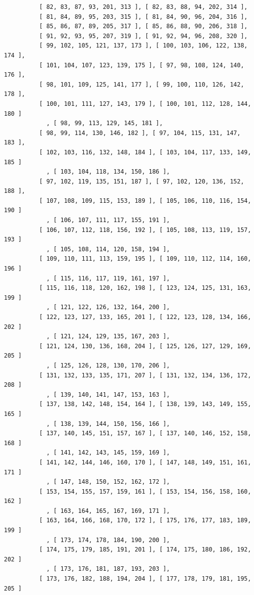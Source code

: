\documentclass{article}
\begin{document}
\begin{verbatim}
          [ 82, 83, 87, 93, 201, 313 ], [ 82, 83, 88, 94, 202, 314 ], 
          [ 81, 84, 89, 95, 203, 315 ], [ 81, 84, 90, 96, 204, 316 ], 
          [ 85, 86, 87, 89, 205, 317 ], [ 85, 86, 88, 90, 206, 318 ], 
          [ 91, 92, 93, 95, 207, 319 ], [ 91, 92, 94, 96, 208, 320 ], 
          [ 99, 102, 105, 121, 137, 173 ], [ 100, 103, 106, 122, 138, 174 ],
          [ 101, 104, 107, 123, 139, 175 ], [ 97, 98, 108, 124, 140, 176 ], 
          [ 98, 101, 109, 125, 141, 177 ], [ 99, 100, 110, 126, 142, 178 ], 
          [ 100, 101, 111, 127, 143, 179 ], [ 100, 101, 112, 128, 144, 180 ]
            , [ 98, 99, 113, 129, 145, 181 ], 
          [ 98, 99, 114, 130, 146, 182 ], [ 97, 104, 115, 131, 147, 183 ], 
          [ 102, 103, 116, 132, 148, 184 ], [ 103, 104, 117, 133, 149, 185 ]
            , [ 103, 104, 118, 134, 150, 186 ], 
          [ 97, 102, 119, 135, 151, 187 ], [ 97, 102, 120, 136, 152, 188 ], 
          [ 107, 108, 109, 115, 153, 189 ], [ 105, 106, 110, 116, 154, 190 ]
            , [ 106, 107, 111, 117, 155, 191 ], 
          [ 106, 107, 112, 118, 156, 192 ], [ 105, 108, 113, 119, 157, 193 ]
            , [ 105, 108, 114, 120, 158, 194 ], 
          [ 109, 110, 111, 113, 159, 195 ], [ 109, 110, 112, 114, 160, 196 ]
            , [ 115, 116, 117, 119, 161, 197 ], 
          [ 115, 116, 118, 120, 162, 198 ], [ 123, 124, 125, 131, 163, 199 ]
            , [ 121, 122, 126, 132, 164, 200 ], 
          [ 122, 123, 127, 133, 165, 201 ], [ 122, 123, 128, 134, 166, 202 ]
            , [ 121, 124, 129, 135, 167, 203 ], 
          [ 121, 124, 130, 136, 168, 204 ], [ 125, 126, 127, 129, 169, 205 ]
            , [ 125, 126, 128, 130, 170, 206 ], 
          [ 131, 132, 133, 135, 171, 207 ], [ 131, 132, 134, 136, 172, 208 ]
            , [ 139, 140, 141, 147, 153, 163 ], 
          [ 137, 138, 142, 148, 154, 164 ], [ 138, 139, 143, 149, 155, 165 ]
            , [ 138, 139, 144, 150, 156, 166 ], 
          [ 137, 140, 145, 151, 157, 167 ], [ 137, 140, 146, 152, 158, 168 ]
            , [ 141, 142, 143, 145, 159, 169 ], 
          [ 141, 142, 144, 146, 160, 170 ], [ 147, 148, 149, 151, 161, 171 ]
            , [ 147, 148, 150, 152, 162, 172 ], 
          [ 153, 154, 155, 157, 159, 161 ], [ 153, 154, 156, 158, 160, 162 ]
            , [ 163, 164, 165, 167, 169, 171 ], 
          [ 163, 164, 166, 168, 170, 172 ], [ 175, 176, 177, 183, 189, 199 ]
            , [ 173, 174, 178, 184, 190, 200 ], 
          [ 174, 175, 179, 185, 191, 201 ], [ 174, 175, 180, 186, 192, 202 ]
            , [ 173, 176, 181, 187, 193, 203 ], 
          [ 173, 176, 182, 188, 194, 204 ], [ 177, 178, 179, 181, 195, 205 ]

\end{verbatim}
\end{document}
